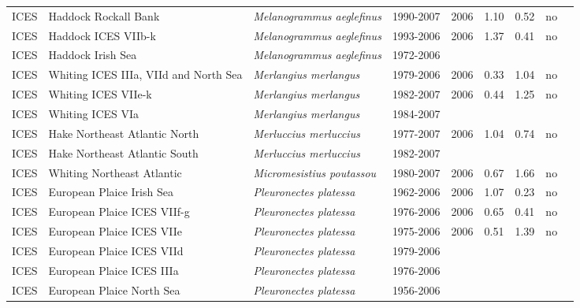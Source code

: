 \begin{longtable}{p{1.8cm}p{4cm}p{4cm}ccccp{1.9cm}c}
  ICES & Haddock Rockall Bank & \textit{Melanogrammus aeglefinus} & 1990-2007 & 2006 & 1.10 & 0.52 & no & \cite{ICES-WGNSDS-2007.pdf} \\ 
  ICES & Haddock ICES VIIb-k & \textit{Melanogrammus aeglefinus} & 1993-2006 & 2006 & 1.37 & 0.41 & no & \cite{ICES-WGSSDS-2007.pdf} \\ 
  ICES & Haddock Irish Sea & \textit{Melanogrammus aeglefinus} & 1972-2006 &  &  &  &  & \cite{ICES-WGNSDS-2007.pdf} \\ 
  ICES & Whiting ICES IIIa, VIId and North Sea & \textit{Merlangius merlangus} & 1979-2006 & 2006 & 0.33 & 1.04 & no & \cite{ICES-WGNSSK-2007.pdf} \\ 
  ICES & Whiting ICES VIIe-k & \textit{Merlangius merlangus} & 1982-2007 & 2006 & 0.44 & 1.25 & no & \cite{ICES-WGSSDS-2007.pdf} \\ 
  ICES & Whiting ICES VIa & \textit{Merlangius merlangus} & 1984-2007 &  &  &  &  & \cite{ICES-WGNSDS-2007.pdf} \\ 
  ICES & Hake Northeast Atlantic North & \textit{Merluccius merluccius} & 1977-2007 & 2006 & 1.04 & 0.74 & no & \cite{ICES-WGHMM-2007.pdf} \\ 
  ICES & Hake Northeast Atlantic South & \textit{Merluccius merluccius} & 1982-2007 &  &  &  &  & \cite{ICES-WGHMM-2007.pdf} \\ 
  ICES & Whiting Northeast Atlantic & \textit{Micromesistius poutassou} & 1980-2007 & 2006 & 0.67 & 1.66 & no & \cite{ICES-WGNPBW-2007.pdf} \\ 
  ICES & European Plaice Irish Sea & \textit{Pleuronectes platessa} & 1962-2006 & 2006 & 1.07 & 0.23 & no & \cite{ICES-WGNSDS-2007.pdf} \\ 
  ICES & European Plaice ICES VIIf-g & \textit{Pleuronectes platessa} & 1976-2006 & 2006 & 0.65 & 0.41 & no & \cite{ICES-WGSSDS-2007.pdf} \\ 
  ICES & European Plaice ICES VIIe & \textit{Pleuronectes platessa} & 1975-2006 & 2006 & 0.51 & 1.39 & no & \cite{ICES-WGSSDS-2007.pdf} \\ 
  ICES & European Plaice ICES VIId & \textit{Pleuronectes platessa} & 1979-2006 &  &  &  &  & \cite{ICES-WGNSSK-2007.pdf} \\ 
  ICES & European Plaice ICES IIIa & \textit{Pleuronectes platessa} & 1976-2006 &  &  &  &  & \cite{ICES-WGNSSK-2007.pdf} \\ 
  ICES & European Plaice North Sea & \textit{Pleuronectes platessa} & 1956-2006 &  &  &  &  & \cite{ICES-WGNSSK-2007.pdf} \\ 

\end{longtable}
